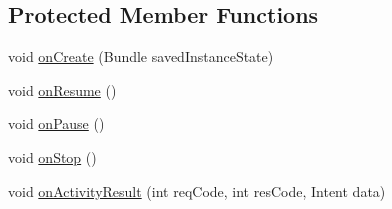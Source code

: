 \subsection*{Protected Member Functions}
\begin{DoxyCompactItemize}
\item 
void \hyperlink{classuk_1_1ac_1_1swan_1_1digitaltrails_1_1activities_1_1_map_activity_a9604f4b84594a1fee2389772b3070914}{on\+Create} (Bundle saved\+Instance\+State)
\item 
void \hyperlink{classuk_1_1ac_1_1swan_1_1digitaltrails_1_1activities_1_1_map_activity_a190bbbb4b068268fba6ae30cc34024dc}{on\+Resume} ()
\item 
void \hyperlink{classuk_1_1ac_1_1swan_1_1digitaltrails_1_1activities_1_1_map_activity_a823e94707eb400a79fcf867c6f2a1379}{on\+Pause} ()
\item 
void \hyperlink{classuk_1_1ac_1_1swan_1_1digitaltrails_1_1activities_1_1_map_activity_a9d4475e7cf73f417482bc6ba30dee6f6}{on\+Stop} ()
\item 
void \hyperlink{classuk_1_1ac_1_1swan_1_1digitaltrails_1_1activities_1_1_map_activity_ade3334b7c3e082a4375b0751b0e2a953}{on\+Activity\+Result} (int req\+Code, int res\+Code, Intent data)
\end{DoxyCompactItemize}
